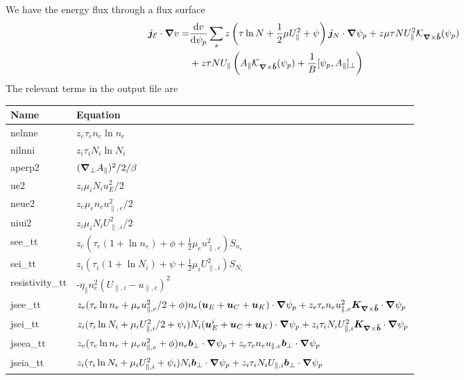 We have the energy flux through a flux surface
\begin{align}
 \vec j_{\mathcal E}\cn v =&%
\frac{\d v}{\d \psi_p}\sum_s z\left (\tau\ln N + \frac{1}{2}\mu U_\parallel^2 + \psi\right) \vec j_N\cn\psi_p
+ z \mu\tau NU_\parallel^2 \mathcal K_{\vn\times\bhat}(\psi_p) \nonumber\\
&+ z \tau NU_\parallel
 \left( A_\parallel \mathcal
 K_{\vn\times\bhat}(\psi_p) + \frac{1}{B}[\psi_p, A_\parallel]_\perp\right)
\label{eq:energy_flux}
\end{align}
The relevant terms in the output file are
\begin{longtable}{ll}
\toprule
\rowcolor{gray!50}\textbf{Name} &  \textbf{Equation}\\
\midrule
    nelnne &$ z_e\tau_e n_e \ln n_e$ \\
    nilnni &$ z_i\tau_i N_i \ln N_i$ \\
    aperp2 &$ ({\boldsymbol{\nabla}}_{\perp} A_\parallel)^2/2/\beta$ \\
    ue2   &$z_i\mu_i N_i u_E^2 /2$ \\
    neue2 &$ z_e\mu_e n_e u_{\parallel,e}^2/2$ \\
    niui2 &$ z_i\mu_i N_i U_{\parallel,i}^2/2$ \\
    see\_tt & $z_e(\tau_e (1+\ln n_e) + \phi + \frac{1}{2}\mu_e u_{\parallel,e}^2) S_{n_e} $ \\
    sei\_tt & $z_i(\tau_i (1+\ln N_i) + \psi + \frac{1}{2}\mu_i U_{\parallel,i}^2) S_{N_i} $ \\
    resistivity\_tt &-$\eta_\parallel n_e^2 (U_{\parallel,i}-u_{\parallel,e})^2$ \\
    jsee\_tt &$z_e(\tau_e \ln n_e + \mu_e u_{\parallel,e}^2/2 + \phi)n_e({\boldsymbol{u}}_E + {\boldsymbol{u}}_C + {\boldsymbol{u}}_K)\cdot{\boldsymbol{\nabla}} \psi_p
        + z_e \tau_e n_e u_{\parallel,e}^2 {\boldsymbol{K}}_{{\boldsymbol{\nabla}}\times\bm{\hat{b}}}\cdot{\boldsymbol{\nabla}} \psi_p$ \\
    jsei\_tt &$z_i(\tau_i \ln N_i + \mu_i U_{\parallel,i}^2/2 + \psi_i)N_i({\boldsymbol{u}}_E^i + {\boldsymbol{u}}_C + {\boldsymbol{u}}_K)\cdot{\boldsymbol{\nabla}} \psi_p
        + z_i \tau_i N_i U_{\parallel,i}^2 {\boldsymbol{K}}_{{\boldsymbol{\nabla}}\times\bm{\hat{b}}}\cdot{\boldsymbol{\nabla}} \psi_p$ \\
    jseea\_tt &$z_e(\tau_e \ln n_e + \mu_e u_{\parallel,e}^2 + \phi)n_e {\boldsymbol{ b}}_\perp\cdot{\boldsymbol{\nabla}} \psi_p
        + z_e \tau_e n_e u_{\parallel,e} {\boldsymbol{ b}}_\perp \cdot{\boldsymbol{\nabla}} \psi_p $ \\
    jseia\_tt &$z_i(\tau_i \ln N_i + \mu_i U_{\parallel,i}^2 + \psi_i)N_i {\boldsymbol{ b}}_\perp\cdot{\boldsymbol{\nabla}} \psi_p
        + z_i \tau_i N_i U_{\parallel,i} {\boldsymbol{ b}}_\perp \cdot{\boldsymbol{\nabla}} \psi_p $ \\

\end{longtable}
